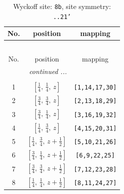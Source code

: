 \documentclass[fleqn,8pt]{jsarticle}
\begin{document}
\begin{longtable}{ccc}
\caption{Wyckoff site: {\tt 8b}, site symmetry: {\tt ..21'}}
 \\
 \hline \hline
No. & position & mapping \\ \hline \endfirsthead

\multicolumn{2}{l}{\tablename\ \thetable{}} \\
 \hline \hline
No. & position & mapping \\ \hline \endhead

 \hline \hline
\multicolumn{2}{r}{\footnotesize\it continued ...} \\ \endfoot

 \hline \hline
\multicolumn{2}{r}{} \\ \endlastfoot

1 & $\left[ \frac{1}{4},\, \frac{1}{4},\, z \right]$ & {\tt [1,14,17,30]} \\ \hline
2 & $\left[ \frac{3}{4},\, \frac{3}{4},\, z \right]$ & {\tt [2,13,18,29]} \\ \hline
3 & $\left[ \frac{3}{4},\, \frac{1}{4},\, z \right]$ & {\tt [3,16,19,32]} \\ \hline
4 & $\left[ \frac{1}{4},\, \frac{3}{4},\, z \right]$ & {\tt [4,15,20,31]} \\ \hline
5 & $\left[ \frac{1}{4},\, \frac{3}{4},\, z + \frac{1}{2} \right]$ & {\tt [5,10,21,26]} \\ \hline
6 & $\left[ \frac{3}{4},\, \frac{1}{4},\, z + \frac{1}{2} \right]$ & {\tt [6,9,22,25]} \\ \hline
7 & $\left[ \frac{3}{4},\, \frac{3}{4},\, z + \frac{1}{2} \right]$ & {\tt [7,12,23,28]} \\ \hline
8 & $\left[ \frac{1}{4},\, \frac{1}{4},\, z + \frac{1}{2} \right]$ & {\tt [8,11,24,27]} \\
\end{longtable}
\renewcommand{\arraystretch}{1.2}
\end{document}
